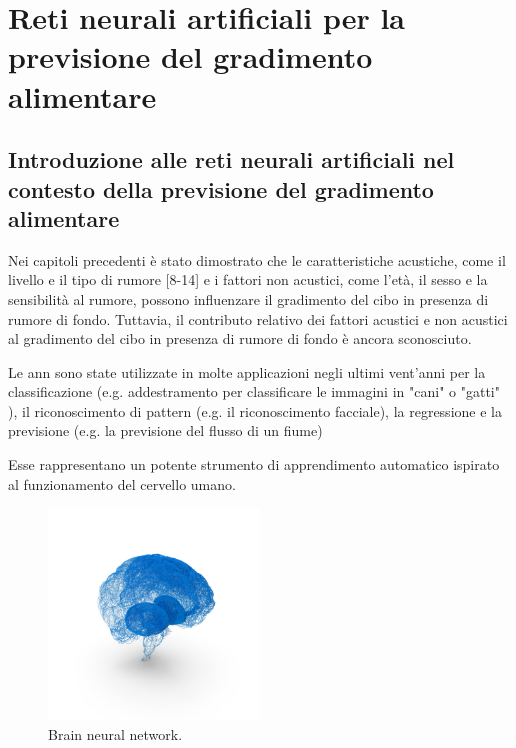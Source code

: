 
%

\chapter{Reti neurali artificiali per la previsione del gradimento alimentare}
\label{cha:chapter4}

\section{Introduzione alle reti neurali artificiali nel contesto della previsione del gradimento alimentare}
\noindent
Nei capitoli precedenti è stato dimostrato che le caratteristiche acustiche, come il livello e il tipo di rumore [8-14] e i fattori non acustici, come l'età, il sesso e la sensibilità al rumore, possono influenzare il gradimento del cibo in presenza di rumore di fondo. Tuttavia, il contributo relativo dei fattori acustici e non acustici al gradimento del cibo in presenza di rumore di fondo è ancora sconosciuto.

Le \gls{ann} sono state utilizzate in molte applicazioni negli ultimi vent'anni per la classificazione (e.g. addestramento per classificare le immagini in "cani" o "gatti" ), il riconoscimento di pattern (e.g. il riconoscimento facciale), la regressione e la previsione (e.g. la previsione del flusso di un fiume) %

Esse rappresentano un potente strumento di apprendimento automatico ispirato al funzionamento del cervello umano. 

\begin{figure}[H]
    \centering
    \includegraphics[width=0.5\textwidth]{Chapters/Figures/brain.png}
    \caption{\small Brain neural network.}
    \label{fig:brain}
\end{figure}


